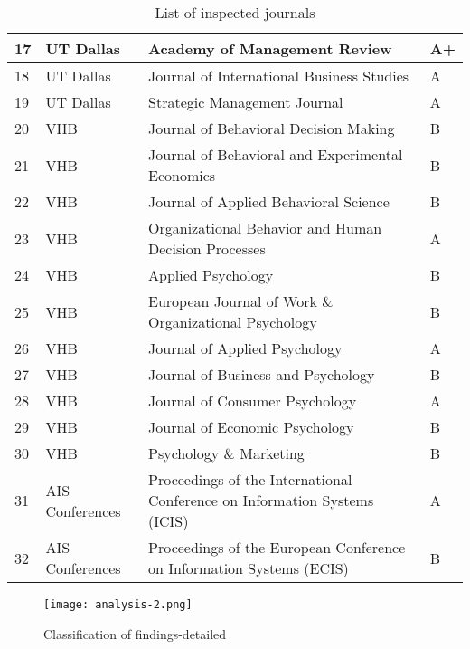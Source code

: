 \begin{table}[h!]
\begin{tabular}{|l|l|p{9cm}|l|}
17 & UT Dallas & Academy of Management Review & A+ \\ \hline
18 & UT Dallas & Journal of International Business Studies & A \\ \hline
19 & UT Dallas & Strategic Management Journal & A \\ \hline
20 & VHB & Journal of Behavioral Decision Making & B \\ \hline
21 & VHB & Journal of Behavioral and Experimental Economics & B \\ \hline
22 & VHB & Journal of Applied Behavioral Science & B \\ \hline
23 & VHB & Organizational Behavior and Human Decision Processes & A \\ \hline
24 & VHB & Applied Psychology & B \\ \hline
25 & VHB & European Journal of Work \& Organizational Psychology & B \\ \hline
26 & VHB & Journal of Applied Psychology & A \\ \hline
27 & VHB & Journal of Business and Psychology & B \\ \hline
28 & VHB & Journal of Consumer Psychology & A \\ \hline
29 & VHB & Journal of Economic Psychology & B \\ \hline
30 & VHB & Psychology \& Marketing & B \\ \hline
31 & AIS Conferences & Proceedings of the International Conference on Information Systems (ICIS) & A \\ \hline
32 & AIS Conferences & Proceedings of the European Conference on Information Systems (ECIS) & B \\ \hline
\end{tabular}
\caption{List of inspected journals}
\label{table:journals}
\end{table}

\newpage

\begin{figure}[h!]
    \centering
    \texttt{[image: analysis-2.png]}
    \caption{Classification of findings-detailed}
    \label{fig:analysis-detail}
\end{figure}

\newpage

